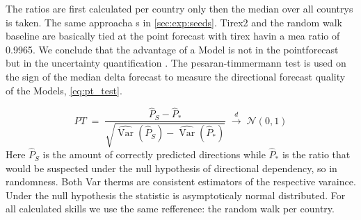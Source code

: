 The ratios are first calculated per country only then the median over all countrys is taken. The same approacha s in \cref{sec:exp:seeds}. Tirex2 and the random walk baseline are basically tied at the point forecast with tirex havin a mea ratio of 0.9965. We conclude that the advantage of a Model is not in the pointforecast but in the uncertainty quantification \parencite{hyndman2006mase}. The pesaran-timmermann test \parencite{pesaran1992} is used on the sign of the median delta forecast to measure the directional forecast quality of the Models, \eqref{eq:pt_test}.


\begin{equation}
  PT \;=\; \frac{\hat{P}_S - \hat{P}_*}{\sqrt{\widehat{\operatorname{Var}}(\hat{P}_S) - \widehat{\operatorname{Var}}(\hat{P}_*)}} \;\xrightarrow{d}\; \mathcal{N}(0,1)
  \label{eq:pt_test}
\end{equation}
\noindent Here $\hat{P}_S$ is the amount of correctly predicted directions while $\hat{P}_*$ is the ratio that would be suspected under the null hypothesis of directional dependency, so in randomness. Both Var therms are consistent estimators of the respective varaince. Under the null hypothesis the statistic is asymptoticaly normal distributed. For all calculated skills we use the same refference: the random walk per country. 



